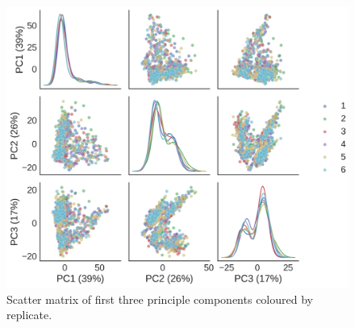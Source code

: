 \documentclass[alpha-refs]{wiley-article}
\newcommand{\tgf}{TGF-$\upbeta$}
\begin{document}
\begin{figure}
	\centering
	\includegraphics[height=0.45\textheight]{img/qc/replicate}
	\caption{Scatter matrix of first three principle components coloured by replicate.}
	\label{fig:qc:replicate}
\end{figure}

\end{document}
